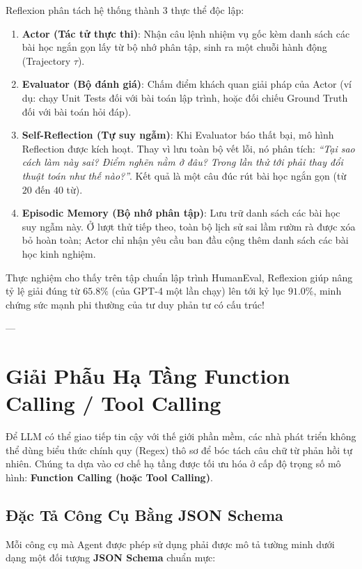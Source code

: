 Reflexion phân tách hệ thống thành 3 thực thể độc lập:
\begin{enumerate}
  \item \textbf{Actor (Tác tử thực thi)}: Nhận câu lệnh nhiệm vụ gốc kèm danh sách các bài học ngắn gọn lấy từ bộ nhớ phân tập, sinh ra một chuỗi hành động (Trajectory $\tau$).
  \item \textbf{Evaluator (Bộ đánh giá)}: Chấm điểm khách quan giải pháp của Actor (ví dụ: chạy Unit Tests đối với bài toán lập trình, hoặc đối chiếu Ground Truth đối với bài toán hỏi đáp).
  \item \textbf{Self-Reflection (Tự suy ngẫm)}: Khi Evaluator báo thất bại, mô hình Reflection được kích hoạt. Thay vì lưu toàn bộ vết lỗi, nó phân tích: \textit{``Tại sao cách làm này sai? Điểm nghẽn nằm ở đâu? Trong lần thử tới phải thay đổi thuật toán như thế nào?''}. Kết quả là một câu đúc rút bài học ngắn gọn (từ $20$ đến $40$ từ).
  \item \textbf{Episodic Memory (Bộ nhớ phân tập)}: Lưu trữ danh sách các bài học suy ngẫm này. Ở lượt thử tiếp theo, toàn bộ lịch sử sai lầm rườm rà được xóa bỏ hoàn toàn; Actor chỉ nhận yêu cầu ban đầu cộng thêm danh sách các bài học kinh nghiệm.
\end{enumerate}

Thực nghiệm cho thấy trên tập chuẩn lập trình HumanEval, Reflexion giúp nâng tỷ lệ giải đúng từ $65.8\%$ (của GPT-4 một lần chạy) lên tới kỷ lục \textbf{$91.0\%$}, minh chứng sức mạnh phi thường của tư duy phản tư có cấu trúc!

---

\section{Giải Phẫu Hạ Tầng Function Calling / Tool Calling}
\label{sec:tool-calling-internals}

Để LLM có thể giao tiếp tin cậy với thế giới phần mềm, các nhà phát triển không thể dùng biểu thức chính quy (Regex) thô sơ để bóc tách câu chữ từ phản hồi tự nhiên. Chúng ta dựa vào cơ chế hạ tầng được tối ưu hóa ở cấp độ trọng số mô hình: \textbf{Function Calling (hoặc Tool Calling)}.

\subsection{Đặc Tả Công Cụ Bằng JSON Schema}
Mỗi công cụ mà Agent được phép sử dụng phải được mô tả tường minh dưới dạng một đối tượng \textbf{JSON Schema} chuẩn mực:

